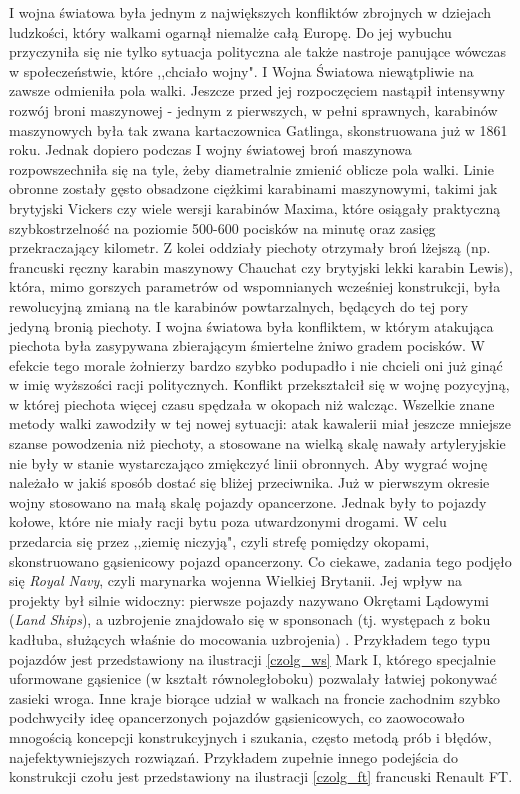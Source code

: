I wojna światowa była jednym z największych konfliktów zbrojnych w dziejach ludzkości, który walkami ogarnął niemalże całą Europę. Do jej wybuchu przyczyniła się nie tylko sytuacja polityczna ale także nastroje panujące wówczas w społeczeństwie, które ,,chciało wojny". I Wojna Światowa niewątpliwie na zawsze odmieniła pola walki. Jeszcze przed jej rozpoczęciem nastąpił intensywny rozwój broni maszynowej - jednym z pierwszych, w pełni sprawnych, karabinów maszynowych była tak zwana kartaczownica Gatlinga, skonstruowana już w 1861 roku. Jednak dopiero podczas I wojny światowej broń maszynowa rozpowszechniła się na tyle, żeby diametralnie zmienić oblicze pola walki. Linie obronne zostały gęsto obsadzone ciężkimi karabinami maszynowymi, takimi jak brytyjski Vickers czy wiele wersji karabinów Maxima, które osiągały praktyczną szybkostrzelność na poziomie 500-600 pocisków na minutę oraz zasięg przekraczający kilometr. Z kolei oddziały piechoty otrzymały broń lżejszą (np. francuski ręczny karabin maszynowy Chauchat czy brytyjski lekki karabin Lewis), która, mimo gorszych parametrów od wspomnianych wcześniej konstrukcji, była rewolucyjną zmianą na tle karabinów powtarzalnych, będących do tej pory jedyną bronią piechoty. I wojna światowa była konfliktem, w którym atakująca piechota była zasypywana zbierającym śmiertelne żniwo gradem pocisków. W efekcie tego morale żołnierzy bardzo szybko podupadło i nie chcieli oni już ginąć w imię wyższości racji politycznych. Konflikt przekształcił się w wojnę pozycyjną, w której piechota więcej czasu spędzała w okopach niż walcząc. Wszelkie znane metody walki zawodziły w tej nowej sytuacji: atak kawalerii miał jeszcze mniejsze szanse powodzenia niż piechoty, a stosowane na wielką skalę nawały artyleryjskie nie były w stanie wystarczająco zmiękczyć linii obronnych.
Aby wygrać wojnę należało w jakiś sposób dostać się bliżej przeciwnika. Już w pierwszym okresie wojny stosowano na małą skalę pojazdy opancerzone. Jednak były to pojazdy kołowe, które nie miały racji bytu poza utwardzonymi drogami. W celu przedarcia się przez ,,ziemię niczyją", czyli strefę pomiędzy okopami, skonstruowano gąsienicowy pojazd opancerzony. Co ciekawe, zadania tego podjęło się \textit{Royal Navy}, czyli marynarka wojenna Wielkiej Brytanii. Jej wpływ na projekty był silnie widoczny: pierwsze pojazdy nazywano Okrętami Lądowymi (\textit{Land Ships}), a uzbrojenie znajdowało się w sponsonach (tj. występach z boku kadłuba, służących właśnie do mocowania uzbrojenia) \cite{wojna_pancerna}. Przykładem tego typu pojazdów jest przedstawiony na ilustracji \ref{czolg_ws} Mark I, którego specjalnie uformowane gąsienice (w kształt równoległoboku) pozwalały łatwiej pokonywać zasieki wroga. Inne kraje biorące udział w walkach na froncie zachodnim szybko podchwyciły ideę opancerzonych pojazdów gąsienicowych, co zaowocowało mnogością koncepcji konstrukcyjnych i szukania, często metodą prób i błędów, najefektywniejszych rozwiązań. Przykładem zupełnie innego podejścia do konstrukcji czołu jest przedstawiony na ilustracji \ref{czolg_ft} francuski Renault FT.

